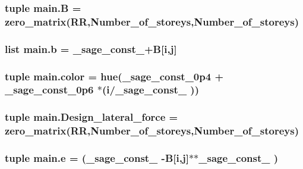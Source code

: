 \subsubsection[{B}]{\setlength{\rightskip}{0pt plus 5cm}tuple main.\+B = zero\+\_\+matrix(R\+R,Number\+\_\+of\+\_\+storeys,Number\+\_\+of\+\_\+storeys)}\label{namespacemain_a6ae8768d11174f5baf9febc5244d6f06}
\hypertarget{namespacemain_ab1e783015bffd2e1d395a9099143d967}{}
\subsubsection[{b}]{\setlength{\rightskip}{0pt plus 5cm}list main.\+b = \+\_\+sage\+\_\+const\+\_+{\bf B}\mbox{[}{\bf i},{\bf j}\mbox{]}}\label{namespacemain_ab1e783015bffd2e1d395a9099143d967}
\hypertarget{namespacemain_aeabbf69db1809807f065c2d1e9a62567}{}
\subsubsection[{color}]{\setlength{\rightskip}{0pt plus 5cm}tuple main.\+color = hue(\+\_\+sage\+\_\+const\+\_\+0p4 + \+\_\+sage\+\_\+const\+\_\+0p6 $\ast$({\bf i}/\+\_\+sage\+\_\+const\+\_ ))}\label{namespacemain_aeabbf69db1809807f065c2d1e9a62567}
\hypertarget{namespacemain_a35df7d294c439792977f174dd5b04ec1}{}
\subsubsection[{Design\+\_\+lateral\+\_\+force}]{\setlength{\rightskip}{0pt plus 5cm}tuple main.\+Design\+\_\+lateral\+\_\+force = zero\+\_\+matrix(R\+R,Number\+\_\+of\+\_\+storeys,Number\+\_\+of\+\_\+storeys)}\label{namespacemain_a35df7d294c439792977f174dd5b04ec1}
\hypertarget{namespacemain_aa7f4fe671f919f7f067f9337ef9e02c0}{}
\subsubsection[{e}]{\setlength{\rightskip}{0pt plus 5cm}tuple main.\+e = (\+\_\+sage\+\_\+const\+\_ -\/{\bf B}\mbox{[}{\bf i},{\bf j}\mbox{]}$\ast$$\ast${\bf \+\_\+sage\+\_\+const\+\_} )}\label{namespacemain_aa7f4fe671f919f7f067f9337ef9e02c0}
\hypertarget{namespacemain_a4612305e50326c88dea04736a647c238}{}
